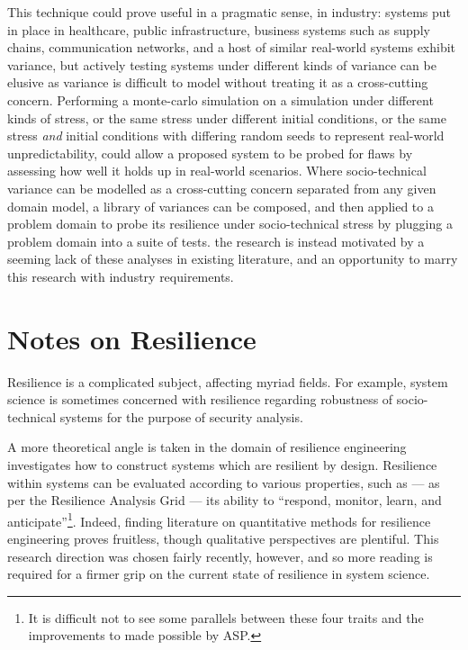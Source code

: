 \documentclass{article}
\begin{document}
This technique could prove useful in a pragmatic sense, in industry: systems put
in place in healthcare, public infrastructure, business systems such as supply
chains, communication networks, and a host of similar real-world systems exhibit
variance, but actively testing systems under different kinds of variance can be
elusive as variance is difficult to model without treating it as a cross-cutting
concern\cite{caise_forum_18}. Performing a monte-carlo simulation on a
simulation under different kinds of stress, or the same stress under different
initial conditions, or the same stress \emph{and} initial conditions with
differing random seeds to represent real-world unpredictability, could allow a
proposed system to be probed for flaws by assessing how well it holds up in
real-world scenarios. Where socio-technical variance can be modelled as a
cross-cutting concern separated from any given domain model, a library of
variances can be composed, and then applied to a problem domain to probe its
resilience under socio-technical stress by plugging a problem domain into a
suite of tests. the research is instead motivated by a seeming lack of these analyses in
existing literature, and an opportunity to marry this research with industry
requirements.\par



\section{Notes on Resilience}
\label{sec:resilience}
Resilience is a complicated subject, affecting myriad fields. For example,
system science is sometimes concerned with resilience regarding robustness of
socio-technical systems for the purpose of security
analysis\cite{bloomfeld_boundaryless_resilience}.

A more theoretical angle is taken in the domain of resilience
engineering\cite{hollnagel_leveson_woods} investigates how to construct systems
which are resilient by design. Resilience within systems can be evaluated
according to various properties, such as --- as per the Resilience Analysis
Grid\cite{hollnagel_RAG} --- its ability to ``respond, monitor, learn, and
anticipate''\footnote{It is difficult not to see some parallels between these
  four traits and the improvements to \pdsf{} made possible by ASP.}. Indeed,
finding literature on quantitative methods for resilience engineering proves
fruitless, though qualitative perspectives are plentiful. This research direction
was chosen fairly recently, however, and so more reading is required for a
firmer grip on the current state of resilience in system science.\par
\end{document}
